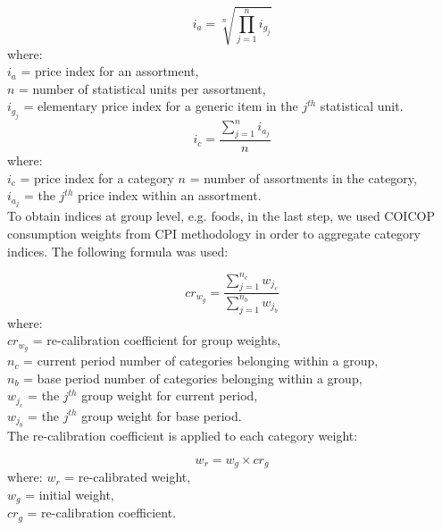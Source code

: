 \documentclass[]{article}
\begin{document}
\begin{equation}\label{eq:4}
i_{a} = \sqrt[n]{\prod_{j=1}^n i_{g_{j}}}
\end{equation}
where:\\
$i_{a}$ = price index for an assortment, \\
$n$ = number of statistical units per assortment, \\
$i_{g_{j}}$ = elementary price index for a generic item in the $j^{th}$ statistical unit.\\


\begin{equation}\label{eq:5}
i_{c} = \frac{\sum_{j=1}^n i_{a_{j}}}{n}
\end{equation}
where:\\
$i_{c}$ = price index for a category
$n$ = number of assortments in the category, \\
$i_{a_{j}}$ = the $j^{th}$ price index within an assortment.\\


To obtain indices at group level, e.g. foods, in the last step, we used COICOP consumption weights from CPI methodology in order to aggregate category indices.  The following formula was used:


\begin{equation}\label{eq:6}
cr_{w_{g}} = \frac{\sum_{j=1}^{n_{c}}{w_{j_{c}}}}{\sum_{j=1}^{n_{b}}{w_{j_{b}}}}
\end{equation}
where:\\
$cr_{w_{g}}$ = re-calibration coefficient for group weights, \\
$n_{c}$ = current period number of categories belonging within a group, \\
$n_{b}$ = base period number of categories belonging within a group, \\
$w_{j_{c}}$ = the $j^{th}$ group weight for current period, \\
$w_{j_{b}}$ = the $j^{th}$ group weight for base period.\\

The re-calibration coefficient is applied to each category weight:

\begin{equation}\label{eq:7}
  w_{r} = w_{g} \times cr_{g}
\end{equation}
where:
$w_{r}$ = re-calibrated weight, \\
$w_{g}$ = initial weight, \\
$cr_{g}$ = re-calibration coefficient.\\
\end{document}
